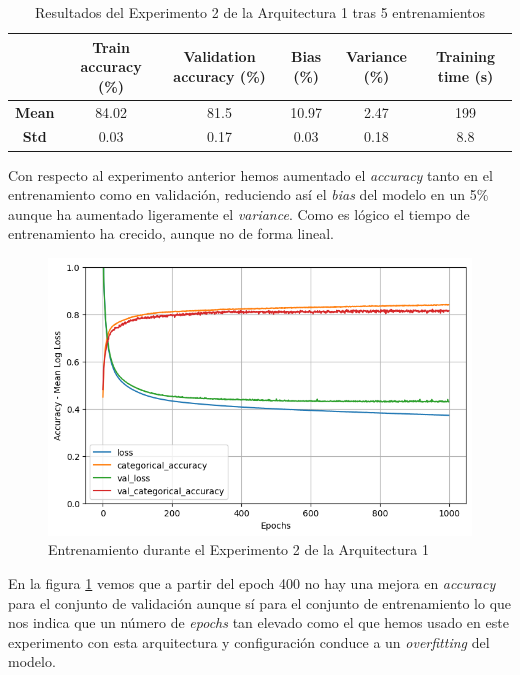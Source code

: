 \documentclass{article}
\begin{document}
			\begin{table}[!h]
				\begin{center}
					\begin{tabular}{ c | c | c | c | c | c |}
						\ & \textbf{Train accuracy (\%)} & \textbf{Validation accuracy (\%)} & \textbf{Bias (\%)} & \textbf{Variance (\%)} & \textbf{Training time (s)} \\ \hline
						\textbf{Mean} & 84.02 & 81.5 & 10.97 & 2.47 & 199\\ \hline
						\textbf{Std} & 0.03 & 0.17 & 0.03 & 0.18 & 8.8 \\ \hline
					\end{tabular}
					\caption{Resultados del Experimento 2 de la Arquitectura 1 tras 5 entrenamientos}
					\label{tab:res-d-a1-e2}
				\end{center}
			\end{table}
			Con respecto al experimento anterior hemos aumentado el \textit{accuracy} tanto en el entrenamiento como en validaci\'on, reduciendo as\'i el \textit{bias} del modelo en un 5\% aunque ha aumentado ligeramente el \textit{variance}. Como es l\'ogico el tiempo de entrenamiento ha crecido, aunque no de forma lineal.\\
			\begin{figure}[!h]
				\begin{center}
					\includegraphics[scale=0.4]{d-tr-a1-e2.png}		
					\caption{Entrenamiento durante el Experimento 2 de la Arquitectura 1}	
					\label{d-tr-a1-e2}
				\end{center}
			\end{figure}
			En la figura \ref{d-tr-a1-e2} vemos que a partir del epoch 400 no hay una mejora en \textit{accuracy} para el conjunto de validaci\'on aunque s\'i para el conjunto de entrenamiento lo que nos indica que un n\'umero de \textit{epochs} tan elevado como el que hemos usado en este experimento con esta arquitectura y configuraci\'on conduce a un \textit{overfitting} del modelo.
			
\end{document}

